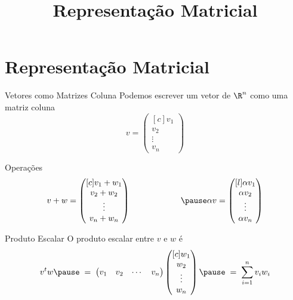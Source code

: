 \documentclass[fleqn,aspectratio=169,12pt]{beamer}
\title{Representação Matricial}
\begin{document}
\addtitle

\section{Representação Matricial}

\begin{frame}{Vetores como Matrizes Coluna}
  Podemos escrever um vetor de $\R^n$ como uma matriz coluna
  \[
    v = \begin{pmatrix}[c]
      v_1    \\
      v_2    \\
      \vdots \\
      v_n
    \end{pmatrix}
  \]
\end{frame}

\begin{frame}{Operações}
  \[
    v + w = \begin{pmatrix}[c]
      v_1+w_1 \\
      v_2+w_2 \\
      \vdots  \\
      v_n+w_n
    \end{pmatrix}
  \qquad\qquad\qquad\pause
    \alpha v = \begin{pmatrix}[l]
      \alpha v_1 \\
      \alpha v_2 \\
      \vdots     \\
      \alpha v_n
    \end{pmatrix}
  \]
\end{frame}

\begin{frame}{Produto Escalar}
  O produto escalar entre $v$ e $w$ é
  \pause
  \[
    v^t w
    \pause
    \;=\;
    \begin{pmatrix}
      v_1 & v_2 & \cdots & v_n
    \end{pmatrix}
    \begin{pmatrix}[c]
      w_1    \\
      w_2    \\
      \vdots \\
      w_n
    \end{pmatrix}
    \pause
    \;=\;
    \sum_{i=1}^{n} v_i w_i
  \]
\end{frame}
\end{document}
